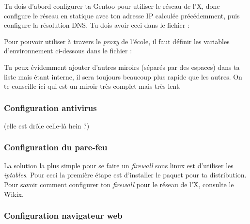 Tu dois d'abord configurer ta Gentoo pour utiliser le réseau de l'X, donc configure le réseau en statique avec ton adresse IP calculée précédemment, puis
configure la résolution DNS. Tu dois avoir ceci dans le fichier  :
\noindent {}

\label{gentoo_mirror} Pour pouvoir utiliser  à travers le \emph{proxy} de l'école, il faut définir les variables d'environnement
ci-dessous dans le fichier  :

Tu peux évidemment ajouter d'autres miroirs (séparés par des espaces) dans ta liste mais
 étant interne, il sera toujours beaucoup plus rapide que les autres. On te
conseille ici  qui est un miroir très complet mais très lent.



\subsubsection{Configuration antivirus}
\footnotesize{(elle est drôle celle-là hein ?)}

\subsubsection{Configuration du pare-feu}

La solution la plus simple pour se faire un \emph{firewall} sous linux est d'utiliser les \emph{iptables}. Pour ceci la première étape est
d'installer le paquet  pour ta distribution. Pour savoir comment configurer ton \emph{firewall} pour le réseau de l'X, consulte le Wikix.

\subsubsection{Configuration navigateur web}

